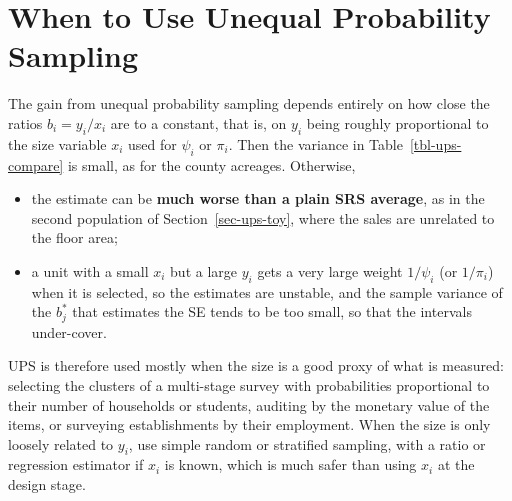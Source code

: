 \documentclass[
  letterpaper,
  DIV=11,
  numbers=noendperiod]{scrreprt}
\providecommand{\tightlist}{%
  \setlength{\itemsep}{0pt}\setlength{\parskip}{0pt}}
\renewcommand{\[}{\begin{equation}}
\renewcommand{\]}{\end{equation}}
\begin{document}
\section{When to Use Unequal Probability Sampling}\label{sec-ups-when}

\begin{tcolorbox}[enhanced jigsaw, arc=.35mm, bottomrule=.15mm, bottomtitle=1mm, breakable, colback=white, colbacktitle=quarto-callout-warning-color!10!white, colframe=quarto-callout-warning-color-frame, coltitle=black, left=2mm, leftrule=.75mm, opacityback=0, opacitybacktitle=0.6, rightrule=.15mm, title=\textcolor{quarto-callout-warning-color}{\faExclamationTriangle}\hspace{0.5em}{Remark: UPS is risky unless y is tied to the size variable}, titlerule=0mm, toprule=.15mm, toptitle=1mm]

The gain from unequal probability sampling depends entirely on how close
the ratios \(b_i=y_i/x_i\) are to a constant, that is, on \(y_i\) being
roughly proportional to the size variable \(x_i\) used for \(\psi_i\) or
\(\pi_i\). Then the variance in Table~\ref{tbl-ups-compare} is small, as
for the county acreages. Otherwise,

\begin{itemize}
\tightlist
\item
  the estimate can be \textbf{much worse than a plain SRS average}, as
  in the second population of Section~\ref{sec-ups-toy}, where the sales
  are unrelated to the floor area;
\item
  a unit with a small \(x_i\) but a large \(y_i\) gets a very large
  weight \(1/\psi_i\) (or \(1/\pi_i\)) when it is selected, so the
  estimates are unstable, and the sample variance of the \(b_j^*\) that
  estimates the SE tends to be too small, so that the intervals
  under-cover.
\end{itemize}

UPS is therefore used mostly when the size is a good proxy of what is
measured: selecting the clusters of a multi-stage survey with
probabilities proportional to their number of households or students,
auditing by the monetary value of the items, or surveying establishments
by their employment. When the size is only loosely related to \(y_i\),
use simple random or stratified sampling, with a ratio or regression
estimator if \(x_i\) is known, which is much safer than using \(x_i\) at
the design stage.

\end{tcolorbox}
\end{document}
